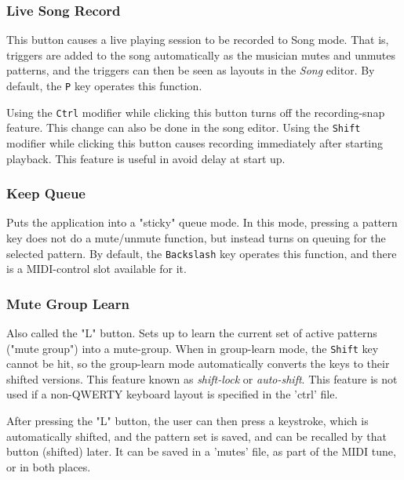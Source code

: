 \subsubsection{Live Song Record}
\label{subsubsec:introduction_live_record_button}

   This button causes a live playing session to be recorded to Song mode.
   That is, triggers are added to the song automatically as the musician mutes
   and unmutes patterns, and the triggers can then be
   seen as layouts in the \textsl{Song} editor.
   By default, the \texttt{P} key operates this function.

   Using the \texttt{Ctrl} modifier while clicking this button
   turns off the recording-snap feature.
   This change can also be done in the song editor.
   Using the \texttt{Shift} modifier while clicking this button
   causes recording immediately after starting playback.
   This feature is useful in avoid delay at start up.

\subsubsection{Keep Queue}
\label{subsubsec:introduction_keep_queue_button}

   Puts the application into a "sticky" queue mode.
   In this mode, pressing a pattern key does not do a mute/unmute function, but
   instead turns on queuing for the selected pattern.
   By default, the \texttt{Backslash} key operates this function,
   and there is a MIDI-control slot available for it.

\subsubsection{Mute Group Learn}
\label{subsubsec:introduction_mute_group_learn_button}

   Also called the "L" button.
   Sets up to learn the current set of active patterns ("mute group") into a
   mute-group.
   When in group-learn mode, the \texttt{Shift} key cannot be hit, so the
   group-learn mode automatically converts the keys to their shifted versions.
   This feature known as \textsl{shift-lock} or \textsl{auto-shift}.
   This feature is not used if a non-QWERTY keyboard layout is
   specified in the 'ctrl' file.

   After pressing the "L" button, the user can then press a keystroke, which is
   automatically shifted, and the pattern set is saved, and can be recalled by
   that button (shifted) later.  It can be saved in a 'mutes' file, as part of
   the MIDI tune, or in both places.

